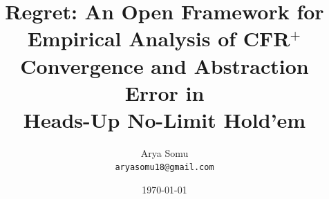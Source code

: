 \documentclass[11pt]{article}
\title{Regret: An Open Framework for Empirical Analysis of CFR$^+$\\
       Convergence and Abstraction Error in\\ Heads-Up No-Limit Hold'em}
\author{Arya Somu \\ \texttt{aryasomu18@gmail.com}}
\date{\today}
\begin{document}
\maketitle

\begin{abstract}

\end{abstract}














\appendix



\end{document}
